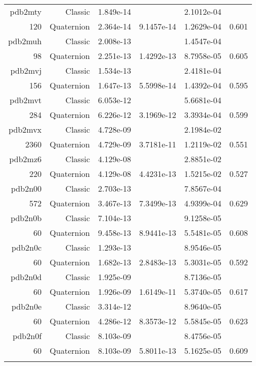 \begin{xltabular}{\textwidth}{r|rS[table-format=1.3e+2]S[table-format=1.4e+2]S[table-format=1.4e+2]S[table-format=-1.3]}
pdb2mty & Classic & 1.849e-14 &  & 2.1012e-04 & \\
120 & Quaternion & 2.364e-14 & 9.1457e-14 & 1.2629e-04 & 0.601\\  \addlinespace
pdb2muh & Classic & 2.008e-13 &  & 1.4547e-04 & \\
98 & Quaternion & 2.251e-13 & 1.4292e-13 & 8.7958e-05 & 0.605\\  \addlinespace
pdb2mvj & Classic & 1.534e-13 &  & 2.4181e-04 & \\
156 & Quaternion & 1.647e-13 & 5.5998e-14 & 1.4392e-04 & 0.595\\  \addlinespace
pdb2mvt & Classic & 6.053e-12 &  & 5.6681e-04 & \\
284 & Quaternion & 6.226e-12 & 3.1969e-12 & 3.3934e-04 & 0.599\\  \addlinespace
{\color{red} pdb2mvx } & Classic & 4.728e-09 &  & 2.1984e-02 & \\
2360 & Quaternion & 4.729e-09 & 3.7181e-11 & 1.2119e-02 & 0.551\\  \addlinespace
{\color{red} pdb2mz6 } & Classic & 4.129e-08 &  & 2.8851e-02 & \\
220 & Quaternion & 4.129e-08 & 4.4231e-13 & 1.5215e-02 & 0.527\\  \addlinespace
pdb2n00 & Classic & 2.703e-13 &  & 7.8567e-04 & \\
572 & Quaternion & 3.467e-13 & 7.3499e-13 & 4.9399e-04 & 0.629\\  \addlinespace
pdb2n0b & Classic & 7.104e-13 &  & 9.1258e-05 & \\
60 & Quaternion & 9.458e-13 & 8.9441e-13 & 5.5481e-05 & 0.608\\  \addlinespace
pdb2n0c & Classic & 1.293e-13 &  & 8.9546e-05 & \\
60 & Quaternion & 1.682e-13 & 2.8483e-13 & 5.3031e-05 & 0.592\\  \addlinespace
pdb2n0d & Classic & 1.925e-09 &  & 8.7136e-05 & \\
60 & Quaternion & 1.926e-09 & 1.6149e-11 & 5.3740e-05 & 0.617\\  \addlinespace
pdb2n0e & Classic & 3.314e-12 &  & 8.9640e-05 & \\
60 & Quaternion & 4.286e-12 & 8.3573e-12 & 5.5845e-05 & 0.623\\  \addlinespace
pdb2n0f & Classic & 8.103e-09 &  & 8.4756e-05 & \\
60 & Quaternion & 8.103e-09 & 5.8011e-13 & 5.1625e-05 & 0.609\\  \addlinespace

\end{xltabular}
